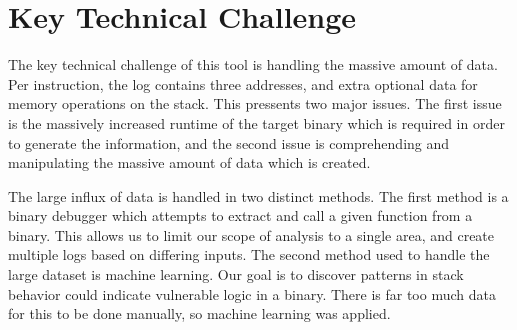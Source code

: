 \documentclass{article}
\begin{document}
\section{Key Technical Challenge}

The key technical challenge of this tool is handling the massive amount of
data. Per instruction, the log contains three addresses, and extra optional
data for memory operations on the stack. This pressents two major issues. The
first issue is the massively increased runtime of the target binary which is
required in order to generate the information, and the second issue is
comprehending and manipulating the massive amount of data which is created.

The large influx of data is handled in two distinct methods. The first method
is a binary debugger which attempts to extract and call a given function from a
binary. This allows us to limit our scope of analysis to a single area, and
create multiple logs based on differing inputs. The second method used to
handle the large dataset is machine learning. Our goal is to discover patterns
in stack behavior could indicate vulnerable logic in a binary. There is far too
much data for this to be done manually, so machine learning was applied.
\end{document}
